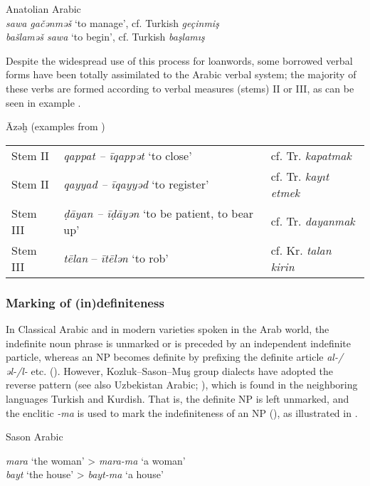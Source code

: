 \documentclass[output=paper]{langsci/langscibook}
\begin{document}
\ea \label{turkverb} Anatolian Arabic \citep[184]{Talay2007}\\
\noindent \textit{sawa gačənməš} `to manage', cf. Turkish \textit{geçinmiş}\\
\textit{ba\v{s}lamə\v{s} sawa} `to begin',  cf. Turkish \textit{başlamış} \\
\z

Despite the widespread use of this process for loanwords, some borrowed verbal forms have been totally assimilated to the Arabic
verbal system; the majority of these verbs are formed according to verbal measures (stems) II or III, as can be seen in example . 


\ea \label{azex} Āzəḫ (examples from \citealt{Talay2007})
\begin{tabular}{@{}lll@{}}
Stem II & \textit{qappat – īqappət} `to close' & cf. Tr. \textit{kapatmak} \\
Stem II & \textit{qayyad – īqayyəd} `to register' & cf. Tr. \textit{kayıt etmek}\\
Stem III & \textit{\d{d}āyan – ī\d{d}āyən} `to be patient, to bear up' & cf. Tr. \textit{dayanmak}\\
Stem III & \textit{tēlan} – \textit{ītēlən} `to rob' & cf. Kr. \textit{talan kirin} \\
\end{tabular}
\z


 \subsubsection{Marking of (in)definiteness}
 
 
In Classical Arabic and in modern varieties spoken in the Arab world, the indefinite noun phrase is unmarked or is preceded by an independent indefinite particle, whereas an NP becomes definite by prefixing the definite article \textit{al-/əl-/l-} etc. (\citealt{Brustad2000}). However, Kozluk--Sason--Mu\c{s} group dialects have adopted the reverse pattern (see also Uzbekistan Arabic; \citealt{Jastrow2005}), which is found in the neighboring languages Turkish and Kurdish. That is, the definite NP is left unmarked, and the enclitic \textit{-ma} is used to mark the indefiniteness of an NP (\citealt{Talay2007,Akkus2016,Akkus2017,AkinJastrowTalay2017,AkkusBenmamoun2018}), as illustrated in . 

\ea \label{ma} Sason Arabic

\textit{mara} `the woman' > \textit{mara-ma} `a woman' \\
\textit{bayt} `the house' > \textit{bayt-ma} `a house'
\z
\end{document}
